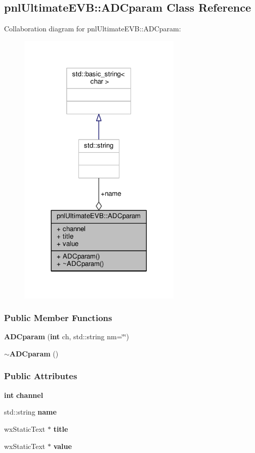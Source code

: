 \subsection{pnl\+Ultimate\+E\+VB\+:\+:A\+D\+Cparam Class Reference}
\label{classpnlUltimateEVB_1_1ADCparam}


Collaboration diagram for pnl\+Ultimate\+E\+VB\+:\+:A\+D\+Cparam\+:
\nopagebreak
\begin{figure}[H]
\begin{center}
\leavevmode
\includegraphics[width=221pt]{d7/da0/classpnlUltimateEVB_1_1ADCparam__coll__graph}
\end{center}
\end{figure}
\subsubsection*{Public Member Functions}
\begin{DoxyCompactItemize}
\item 
{\bf A\+D\+Cparam} ({\bf int} ch, std\+::string nm=\char`\"{}\char`\"{})
\item 
{\bf $\sim$\+A\+D\+Cparam} ()
\end{DoxyCompactItemize}
\subsubsection*{Public Attributes}
\begin{DoxyCompactItemize}
\item 
{\bf int} {\bf channel}
\item 
std\+::string {\bf name}
\item 
wx\+Static\+Text $\ast$ {\bf title}
\item 
wx\+Static\+Text $\ast$ {\bf value}
\end{DoxyCompactItemize}


